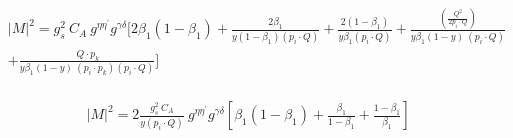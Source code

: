 \begin{equation}
\begin{split}
&{|{M}|}^2 =g_s^2\: C_A\:g^{{{\eta}}{{\eta}^{\prime}}}g^{{{\gamma}}{{\delta}}}[2{\beta_1}(1-\beta_1)+\frac{2\beta_1}{y(1-\beta_1) (p_i \cdot Q)}+\frac{2(1-\beta_1)}{y\beta_1 (p_i \cdot Q)}+\frac{(\frac{Q^2}{2p_i \cdot Q})}{y\beta_1 (1-y)\:(p_i \cdot Q)}\\
&+\frac{\:Q\cdot p_k}{y\beta_1 (1-y)\:(p_i \cdot p_k)(p_i \cdot Q)}]  \\
\end{split}
\end{equation}

\begin{equation}
\begin{split}
&{|{M}|}^2 =2\frac{g_s^2\: C_A}{y(p_i \cdot Q)}\:g^{{{\eta}}{{\eta}^{\prime}}}g^{{{\gamma}}{{\delta}}}[{\beta_1}(1-\beta_1)+\frac{\beta_1}{1-\beta_1 }+\frac{1-\beta_1}{\beta_1 }]  \\
\end{split}
\end{equation}




















